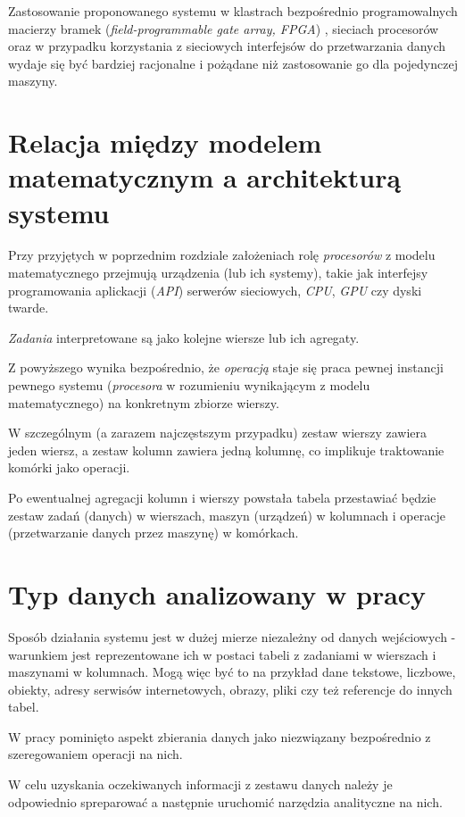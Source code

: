 \documentclass[brudnopis]{xmgr}
\begin{document}
Zastosowanie proponowanego systemu w klastrach bezpośrednio programowalnych macierzy bramek (\emph{field-programmable gate array, FPGA}) \cite{sadrozinski2016applications}, sieciach procesorów oraz w przypadku korzystania z sieciowych interfejsów do przetwarzania danych wydaje się być bardziej racjonalne i pożądane niż zastosowanie go dla pojedynczej maszyny.

\chapter{Relacja między modelem matematycznym a architekturą systemu}

Przy przyjętych w poprzednim rozdziale założeniach rolę \emph{procesorów} z modelu matematycznego przejmują urządzenia (lub ich systemy), takie jak interfejsy programowania aplickacji (\emph{API}) serwerów sieciowych, \emph{CPU}, \emph{GPU} czy dyski twarde.
\medskip

\emph{Zadania} interpretowane są jako kolejne wiersze lub ich agregaty.
\medskip

Z powyższego wynika bezpośrednio, że \emph{operacją} staje się praca pewnej instancji pewnego systemu (\emph{procesora} w rozumieniu wynikającym z modelu matematycznego) na konkretnym zbiorze wierszy.
\medskip

W szczególnym (a zarazem najczęstszym przypadku) zestaw wierszy zawiera jeden wiersz, a zestaw kolumn zawiera jedną kolumnę, co implikuje traktowanie komórki jako operacji.
\medskip

Po ewentualnej agregacji kolumn i wierszy powstała tabela przestawiać będzie zestaw zadań (danych) w wierszach, maszyn (urządzeń) w kolumnach i operacje (przetwarzanie danych przez maszynę) w komórkach.

\chapter{Typ danych analizowany w pracy}

Sposób działania systemu jest w dużej mierze niezależny od danych wejściowych - warunkiem jest reprezentowane ich w postaci tabeli z zadaniami w wierszach i maszynami w kolumnach.
Mogą więc być to na przykład dane tekstowe, liczbowe, obiekty, adresy serwisów internetowych, obrazy, pliki czy też referencje do innych tabel.
\medskip

W pracy pominięto aspekt zbierania danych jako niezwiązany bezpośrednio z szeregowaniem operacji na nich.
\medskip

W celu uzyskania oczekiwanych informacji z zestawu danych należy je odpowiednio spreparować a następnie uruchomić narzędzia analityczne na nich.
\medskip
\end{document}

